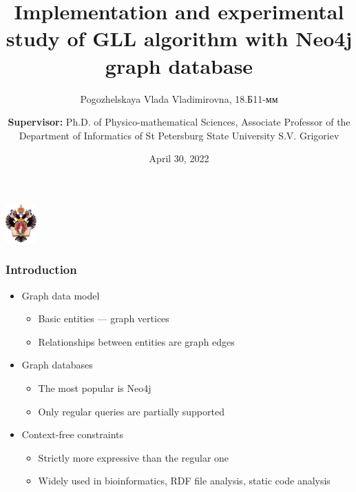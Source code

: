 \documentclass{beamer}
\title[]{Implementation and experimental study of GLL algorithm with Neo4j graph database}
\institute[SPbU]{
St Petersburg State University}
\author[Pogozhelskaya Vlada]{Pogozhelskaya Vlada Vladimirovna, 18.Б11-мм \\
  \and  
    {\bfseries Supervisor:} Ph.D. of Physico-mathematical Sciences, Associate Professor of the Department of Informatics of St Petersburg State University S.V. Grigoriev \\ 
}
\date{April 30, 2022}
\begin{document}
{
\begin{frame}
  \begin{center}
  {\includegraphics[width=1.2cm]{pics/SPbGU_Logo.png}}
  \end{center}
  \titlepage
\end{frame}
}
\begin{frame}[fragile]
  \transwipe[direction=90]
  \frametitle{Introduction}
  \begin{itemize}
      \item Graph data model
      \begin{itemize}
        \item Basic entities --- graph vertices
        \item Relationships between entities are graph edges
      \end{itemize}
    \item Graph databases
\begin{itemize}
    \item The most popular is Neo4j
    \item Only regular queries are partially supported
\end{itemize} 
\item Context-free constraints
\begin{itemize}
    \item Strictly more expressive than the regular one
    \item Widely used in bioinformatics, RDF file analysis, static code analysis
\end{itemize}
\end{itemize}
\end{frame}
\end{document}
